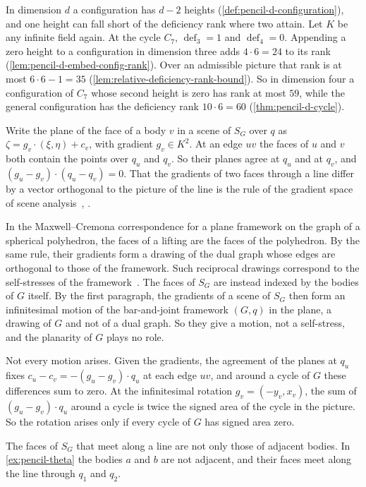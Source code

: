 \begin{example}
  In dimension $d$ a configuration has $d - 2$ heights
  (\cref{def:pencil-d-configuration}), and one height can fall short of
  the deficiency rank where two attain. Let $K$ be any infinite field
  again. At the cycle $C_7$,
  $\operatorname{def}_3 = 1$ and $\operatorname{def}_4 = 0$. Appending a
  zero height to a configuration in dimension three adds $4 \cdot 6 = 24$
  to its rank
  (\cref{lem:pencil-d-embed-config-rank}). Over an admissible picture
  that rank is at most $6 \cdot 6 - 1 = 35$
  (\cref{lem:relative-deficiency-rank-bound}). So in dimension four a
  configuration of $C_7$ whose second height is zero has rank at most
  $59$, while the general configuration has the deficiency rank
  $10 \cdot 6 = 60$ (\cref{thm:pencil-d-cycle}).
\end{example}

\begin{remark}
  \label{rem:pencil-maxwell-cremona}
  Write the plane of the face of a body $v$ in a scene of $S_G$ over $q$
  as $\zeta = g_v \cdot (\xi, \eta) + c_v$, with gradient $g_v \in K^2$.
  At an edge $uv$ the faces of $u$ and $v$ both contain the points over
  $q_u$ and $q_v$. So their planes agree at $q_u$ and at $q_v$, and
  $(g_u - g_v) \cdot (q_u - q_v) = 0$. That the gradients of two faces
  through a line differ by a vector orthogonal to the picture of the line
  is the rule of the gradient space of scene
  analysis~\cite[p.~479]{huffman1977}, \cite[p.~125]{mackworth1973}.

  In the Maxwell--Cremona correspondence for a plane framework on the
  graph of a spherical polyhedron, the faces of a lifting are the faces
  of the polyhedron. By the same rule, their gradients form a drawing of
  the dual graph whose edges are orthogonal to those of the framework.
  Such reciprocal drawings correspond to the self-stresses of the
  framework~\cite[Proposition~4.1, Theorem~4.3]{crapoWhiteley1994}. The
  faces of $S_G$ are instead indexed by the bodies of $G$ itself. By the
  first paragraph, the gradients of a scene of $S_G$ then form an
  infinitesimal motion of the bar-and-joint framework $(G, q)$ in the
  plane, a drawing of $G$ and not of a dual graph. So they give a motion,
  not a self-stress, and the planarity of $G$ plays no role.

  Not every motion arises. Given the gradients, the agreement of the
  planes at $q_u$ fixes $c_u - c_v = -(g_u - g_v) \cdot q_u$ at each
  edge $uv$, and around a cycle of $G$ these differences sum to zero. At
  the infinitesimal rotation $g_v = (-y_v, x_v)$, the sum of
  $(g_u - g_v) \cdot q_u$ around a cycle is twice the signed area of the
  cycle in the picture. So the rotation arises only if every cycle of
  $G$ has signed area zero.

  The faces of $S_G$ that meet along a line are not only those of
  adjacent bodies. In \cref{ex:pencil-theta} the bodies $a$ and $b$ are
  not adjacent, and their faces meet along the line through $q_1$ and
  $q_2$.
\end{remark}

